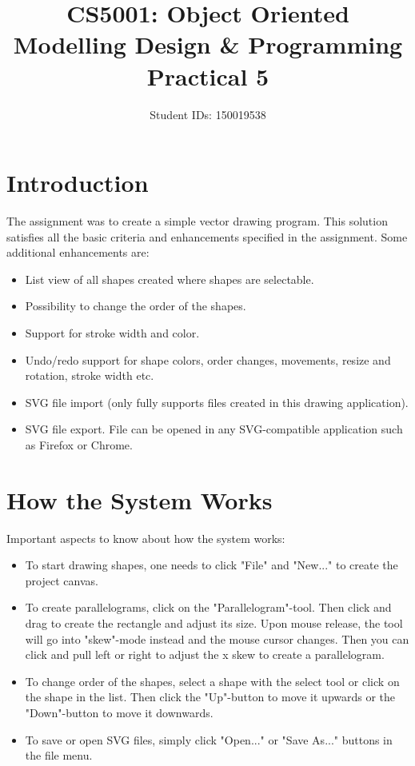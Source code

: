 \documentclass[11pt, a4paper]{article}
\title{CS5001: Object Oriented Modelling Design \& Programming\\Practical 5}
\author{Student IDs: 150019538}
\begin{document}
\maketitle

\section{Introduction}

The assignment was to create a simple vector drawing program. This solution satisfies all the basic criteria and enhancements  specified in the assignment. Some additional enhancements are: 

\begin{itemize}
	\item List view of all shapes created where shapes are selectable.
	\item Possibility to change the order of the shapes.
	\item Support for stroke width and color.
	\item Undo/redo support for shape colors, order changes, movements, resize and rotation, stroke width etc.
	\item SVG file import (only fully supports files created in this drawing application).
	\item SVG file export. File can be opened in any SVG-compatible application such as Firefox or Chrome.
\end{itemize}

\section{How the System Works}

Important aspects to know about how the system works:

\begin{itemize}
	\item To start drawing shapes, one needs to click "File" and "New..." to create the project canvas.
	\item To create parallelograms, click on the "Parallelogram"-tool. Then click and drag to create the rectangle and adjust its size. Upon mouse release, the tool will go into "skew"-mode instead and the mouse cursor changes. Then you can click and pull left or right to adjust the x skew to create a parallelogram.
	\item To change order of the shapes, select a shape with the select tool or click on the shape in the list. Then click the "Up"-button to move it upwards or the "Down"-button to move it downwards.
	\item To save or open SVG files, simply click "Open..." or "Save As..." buttons in the file menu.  
\end{itemize}
\end{document}
